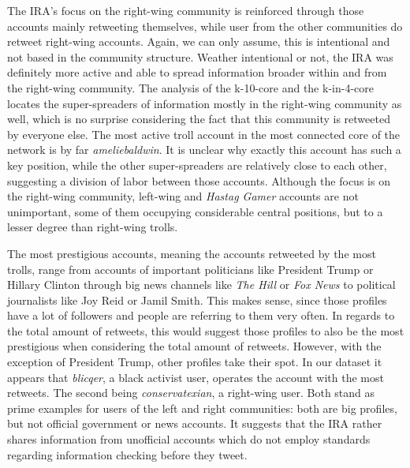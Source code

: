 \documentclass[12pt, titlepage=true, toc=bib]{scrartcl}
\begin{document}
The IRA's focus on the right-wing community is reinforced through those accounts mainly retweeting themselves, while user from the other communities do retweet right-wing accounts. Again, we can only assume, this is intentional and not based in the community structure. Weather intentional or not, the IRA was definitely more active and able to spread information broader within and from the right-wing community. The analysis of the k-10-core and the k-in-4-core locates the super-spreaders of information mostly in the right-wing community as well, which is no surprise considering the fact that this community is retweeted by everyone else. The most active troll account in the most connected core of the network is by far \textit{ameliebaldwin}. It is unclear why exactly this account has such a key position, while the other super-spreaders are relatively close to each other, suggesting a division of labor between those accounts. Although the focus is on the right-wing community, left-wing and \textit{Hastag Gamer} accounts are not unimportant, some of them occupying considerable central positions, but to a lesser degree than right-wing trolls.

The most prestigious accounts, meaning the accounts retweeted by the most trolls, range from accounts of important politicians like President Trump or Hillary Clinton through big news channels like \textit{The Hill} or \textit{Fox News} to political journalists like Joy Reid or Jamil Smith. This makes sense, since those profiles have a lot of followers and people are referring to them very often. In regards to the total amount of retweets, this would suggest those profiles to also be the most prestigious when considering the total amount of retweets. However, with the exception of President Trump, other profiles take their spot. In our dataset it appears that \textit{blicqer}, a black activist user, operates the account with the most retweets. The second being \textit{conservatexian}, a right-wing user. Both stand as prime examples for users of the left and right communities: both are big profiles, but not official government or news accounts. It suggests that the IRA rather shares information from unofficial accounts which do not employ standards regarding information checking before they tweet.
\end{document}
